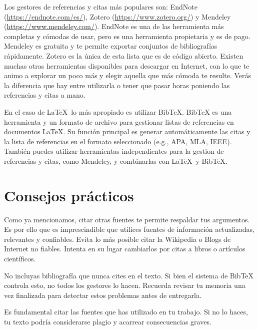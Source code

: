 Los gestores de referencias y citas más populares son: EndNote (\url{https://endnote.com/es/}), Zotero (\url{https://www.zotero.org/}) y Mendeley (\url{https://www.mendeley.com/}). EndNote es una de las herramienta más completas y cómodas de usar, pero es una herramienta propietaria y es de pago. Mendeley es gratuita y te permite exportar conjuntos de bibliografías rápidamente. Zotero es la única de esta lista que es de código abierto. Existen muchas otras herramientas disponibles para descargar en Internet, con lo que te animo a explorar un poco más y elegir aquella que más cómoda te resulte. Verás la diferencia que hay entre utilizarla o tener que pasar horas poniendo las referencias y citas a mano.

En el caso de \LaTeX\ lo más apropiado es utilizar BibTeX. BibTeX es una herramienta y un formato de archivo para gestionar listas de referencias en documentos \LaTeX. Su función principal es generar automáticamente las citas y la lista de referencias en el formato seleccionado (e.g., APA, MLA, IEEE). También puedes utilizar herramientas independientes para la gestion de referencias y citas, como Mendeley, y combinarlas con \LaTeX\ y BibTeX.

\section{Consejos prácticos}

Como ya mencionamos, citar otras fuentes te permite respaldar tus argumentos. Es por ello que es imprescindible que utilices fuentes de información actualizadas, relevantes y confiables. Evita lo más posible citar la Wikipedia o Blogs de Internet no fiables. Intenta en su lugar cambiarlos por citas a libros o artículos científicos.


No incluyas bibliografía que nunca cites en el texto. Si bien el sistema de BibTeX controla esto, no todos los gestores lo hacen. Recuerda revisar tu memoria una vez finalizada para detectar estos problemas antes de entregarla.

Es fundamental citar las fuentes que has utilizado en tu trabajo. Si no lo haces, tu texto podría considerarse plagio y acarrear consecuencias graves.

